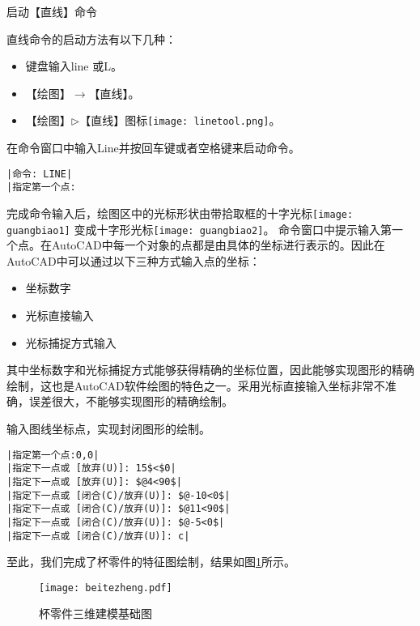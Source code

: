 \begin{procedure}
\item 启动【直线】命令

直线命令的启动方法有以下几种：
\begin{itemize}
\item 键盘输入line 或L。
\item 【绘图】$\rightarrow$【直线】。
\item 【绘图】$\triangleright$【直线】图标\texttt{[image: linetool.png]}。
\end{itemize}
在命令窗口中输入Line并按回车键或者空格键来启动命令。
\begin{lstlisting}
|命令: LINE|
|指定第一个点:
\end{lstlisting}
完成命令输入后，绘图区中的光标形状由带拾取框的十字光标\texttt{[image: guangbiao1]} 变成十字形光标\texttt{[image: guangbiao2]}。
命令窗口中提示输入第一个点。在AutoCAD中每一个对象的点都是由具体的坐标进行表示的。因此在AutoCAD中可以通过以下三种方式输入点的坐标：
\begin{itemize}
\item 坐标数字
\item 光标直接输入
\item 光标捕捉方式输入
\end{itemize}

其中坐标数字和光标捕捉方式能够获得精确的坐标位置，因此能够实现图形的精确绘制，这也是AutoCAD软件绘图的特色之一。采用光标直接输入坐标非常不准确，误差很大，不能够实现图形的精确绘制。
\item 输入图线坐标点，实现封闭图形的绘制。

\begin{lstlisting}
|指定第一个点:0,0|
|指定下一点或 [放弃(U)]: 15$<$0|
|指定下一点或 [放弃(U)]: $@4<90$|
|指定下一点或 [闭合(C)/放弃(U)]: $@-10<0$|
|指定下一点或 [闭合(C)/放弃(U)]: $@11<90$|
|指定下一点或 [闭合(C)/放弃(U)]: $@-5<0$|
|指定下一点或 [闭合(C)/放弃(U)]: c|
\end{lstlisting}

至此，我们完成了杯零件的特征图绘制，结果如图\ref{fig:bettezheng}所示。
\noindent
\begin{figure}[htbp]
\centering
\texttt{[image: beitezheng.pdf]}
\caption{杯零件三维建模基础图}\label{fig:bettezheng}
\end{figure}
\end{procedure}

